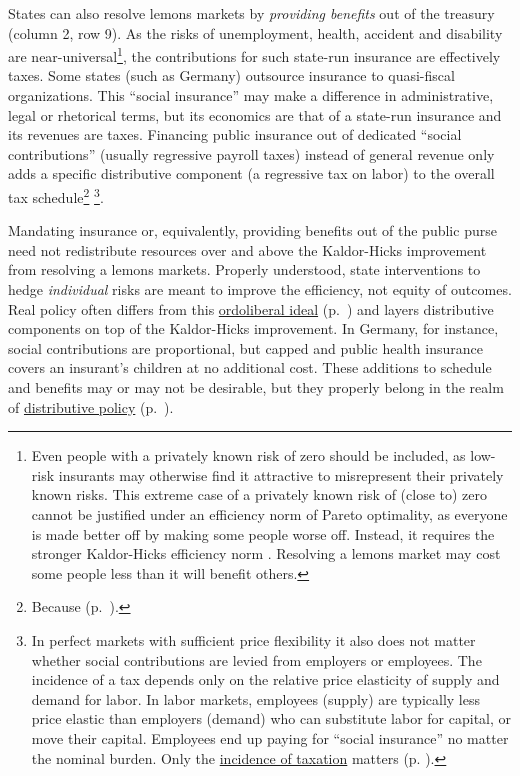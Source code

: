States can also resolve lemons markets by \emph{providing benefits} out of the treasury (column 2, row 9). As the risks of unemployment, health, accident and disability are near-universal\footnote{
	Even people with a privately known risk of zero should be included, as low-risk insurants may otherwise find it attractive to misrepresent their privately known risks. This extreme case of a privately known risk of (close to) zero cannot be justified under an efficiency norm of Pareto optimality, as everyone is made better off by making some people worse off. Instead, it requires the stronger Kaldor-Hicks efficiency norm \citep{Kaldor1939,Hicks1939}. Resolving a lemons market may cost some people less than it will benefit others.}, 
the contributions for such state-run insurance are effectively taxes. Some states (such as Germany) outsource insurance to quasi-fiscal organizations. This ``social insurance'' may make a difference in administrative, legal or rhetorical terms, but its economics are that of a state-run insurance and its revenues are taxes. Financing public insurance out of dedicated ``social contributions'' (usually regressive payroll taxes) instead of general revenue only adds a specific distributive component (a regressive tax on labor) to the overall tax schedule\footnote{
	Because  (p.~\pageref{sec:redistribution-and-revenue-are-one}).}
\footnote{
	In perfect markets with sufficient price flexibility it also does not matter whether social contributions are levied from employers or employees. The incidence of a tax depends only on the relative price elasticity of supply and demand for labor. In labor markets, employees (supply) are typically less price elastic than employers (demand) who can substitute labor for capital, or move their capital. Employees end up paying for ``social insurance'' no matter the nominal burden. Only the \hyperref[sec:well-determined-incidence]{incidence of taxation} matters (p.  \pageref{sec:well-determined-incidence}).}.
	
Mandating insurance or, equivalently, providing benefits out of the public purse need not redistribute resources over and above the Kaldor-Hicks improvement from resolving a lemons markets. Properly understood, state interventions to hedge \emph{individual} risks are meant to improve the efficiency, not equity of outcomes. Real policy often differs from this \hyperref[sec:ordoliberal-hygiene]{ordoliberal ideal} (p.~\pageref{sec:ordoliberal-hygiene}) and layers distributive components on top of the Kaldor-Hicks improvement. In Germany, for instance, social contributions are proportional, but capped and public health insurance covers an insurant's children at no additional cost. These additions to schedule and benefits may or may not be desirable, but they properly belong in the realm of \hyperref[sec:distribution]{distributive policy} (p.~\pageref{sec:distribution}).

